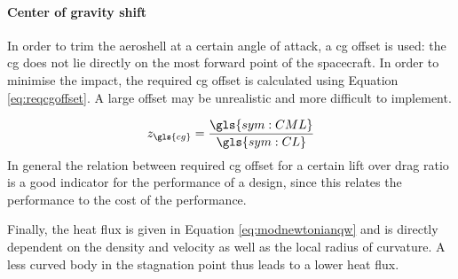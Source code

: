 \paragraph{Center of gravity shift}
In order to trim the aeroshell at a certain angle of attack, a \gls{cg} offset is used: the \gls{cg} does not lie directly on the most forward point of the spacecraft. In order to minimise the impact, the required \gls{cg} offset is calculated using Equation \ref{eq:reqcgoffset}. A large offset may be unrealistic and more difficult to implement.

\begin{equation} \label{eq:reqcgoffset}
z_{\gls{cg}} = \frac{\gls{sym:CML}}{\gls{sym:CL}}
\end{equation}
In general the relation between required \gls{cg} offset for a certain lift over drag ratio is a good indicator for the performance of a design, since this relates the performance to the cost of the performance.

Finally, the heat flux is given in Equation \ref{eq:modnewtonianqw} and is directly dependent on the density and velocity as well as the local radius of curvature. A less curved body in the stagnation point thus leads to a lower heat flux.

